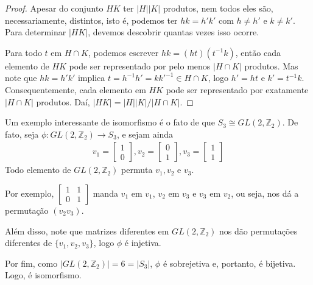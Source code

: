 \documentclass[a4paper,portuguese,11pt,twoside, leqno]{book}
\theoremstyle{definition}
\begin{document}
	\begin{proof}
		Apesar do conjunto $HK$ ter $|H||K|$ produtos, nem todos eles são, necessariamente, distintos, isto é, podemos ter $hk = h'k'$ com $h\neq h'$ e $k\neq k'$. Para determinar $|HK|$, devemos descobrir quantas vezes isso ocorre. 
		\par\vspace{0.3cm} Para todo $t$ em $H\cap K$, podemos escrever $hk = (ht)(t^{-1}k)$, então cada elemento de $HK$ pode ser representado por pelo menos $|H\cap K|$ produtos. Mas note que $hk = h'k'$ implica $t = h^{-1}h' = kk'^{-1}\in H\cap K$, logo $h' = ht$ e $k' = t^{-1}k$. Consequentemente, cada elemento em $HK$ pode ser representado por exatamente $|H\cap K|$ produtos. Daí, $|HK| = |H||K|/|H\cap K|$.
	\end{proof}
	\par\vspace{0.3cm} Um exemplo interessante de isomorfismo é o fato de que $S_3\cong GL(2,\mathbb{Z}_2)$. De fato, seja $\phi:GL(2,\mathbb{Z}_2)\to S_3$, e sejam ainda
	\begin{align*}
	v_1 = \begin{bmatrix}
	1 \\
	0
	\end{bmatrix}, 
	v_2 =  \begin{bmatrix}
	0 \\ 
	1
	\end{bmatrix}, 
	v_3 = \begin{bmatrix}
	1 \\ 
	1
	\end{bmatrix}
	\end{align*}
	Todo elemento de $GL(2,\mathbb{Z}_2)$ permuta $v_1, v_2$ e $v_3$.
	\par\vspace{0.3cm} Por exemplo, $\begin{bmatrix}
	1 & 1 \\ 
	0 & 1
	\end{bmatrix}$
	manda $v_1$ em $v_1$, $v_2$ em $v_3$ e $v_3$ em $v_2$, ou seja, nos dá a permutação $(v_2v_3)$.
	\par\vspace{0.3cm} Além disso, note que matrizes diferentes em $GL(2, \mathbb{Z}_2)$ nos dão permutações diferentes de $\{v_1, v_2,v_3\}$, logo $\phi$ é injetiva.
	\par\vspace{0.3cm} Por fim, como $|GL(2, \mathbb{Z}_2)| = 6 = |S_3|$, $\phi$ é sobrejetiva e, portanto, é bijetiva. Logo, é isomorfismo. 
\end{document}
